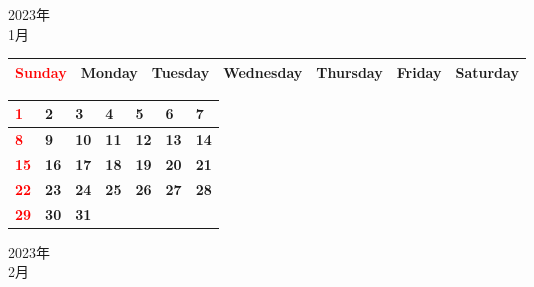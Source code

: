 \documentclass[a4paper,landscape]{jsarticle}
\newcommand{\dig}{\hspace{29mm}}
\newcommand{\tdig}{\hspace{27mm}}
\newcommand{\LBF}{\LARGE\textbf}
\begin{document}
\pagestyle{empty}

\begin{center}
	\LARGE 2023年\\
	\LARGE 1月
\end{center}

\begingroup
\renewcommand{\arraystretch}{1.4}
\begin{tabular}{|>{\centering\arraybackslash}p{32mm}|>{\centering\arraybackslash}p{32mm}|>{\centering\arraybackslash}p{32mm}|>{\centering\arraybackslash}p{32mm}|>{\centering\arraybackslash}p{32mm}|>{\centering\arraybackslash}p{32mm}|>{\centering\arraybackslash}p{32mm}|}
\hline
\textcolor{red}{\large Sunday}&\large Monday&\large Tuesday&\large Wednesday&\large Thursday&\large Friday&\large Saturday\\
\hline
\end{tabular}
\endgroup

\begingroup
\renewcommand{\arraystretch}{4}
\begin{tabular}{|p{32mm}|p{32mm}|p{32mm}|p{32mm}|p{32mm}|p{32mm}|p{32mm}|}
\hline
\raisebox{30pt} {\dig\textcolor{red}{\LBF{1}}}&\raisebox{30pt} {\dig\LBF{2}}&\raisebox{30pt} {\dig\LBF{3}}&\raisebox{30pt} {\dig\LBF{4}}&\raisebox{30pt} {\dig\LBF{5}}&\raisebox{30pt} {\dig\LBF{6}}&\raisebox{30pt} {\dig\LBF{7}}\\
\hline
\raisebox{30pt} {\dig\textcolor{red}{\LBF{8}}}&\raisebox{30pt} {\dig\LBF{9}}&\raisebox{30pt} {\tdig\LBF{10}}&\raisebox{30pt} {\tdig\LBF{11}}&\raisebox{30pt} {\tdig\LBF{12}}&\raisebox{30pt} {\tdig\LBF{13}}&\raisebox{30pt} {\tdig\LBF{14}}\\
\hline
\raisebox{30pt} {\tdig\textcolor{red}{\LBF{15}}}&\raisebox{30pt} {\tdig\LBF{16}}&\raisebox{30pt} {\tdig\LBF{17}}&\raisebox{30pt} {\tdig\LBF{18}}&\raisebox{30pt} {\tdig\LBF{19}}&\raisebox{30pt} {\tdig\LBF{20}}&\raisebox{30pt} {\tdig\LBF{21}}\\
\hline
\raisebox{30pt} {\tdig\textcolor{red}{\LBF{22}}}&\raisebox{30pt} {\tdig\LBF{23}}&\raisebox{30pt} {\tdig\LBF{24}}&\raisebox{30pt} {\tdig\LBF{25}}&\raisebox{30pt} {\tdig\LBF{26}}&\raisebox{30pt} {\tdig\LBF{27}}&\raisebox{30pt} {\tdig\LBF{28}}\\
\hline
\raisebox{30pt} {\tdig\textcolor{red}{\LBF{29}}}&\raisebox{30pt} {\tdig\LBF{30}}&\raisebox{30pt} {\tdig\LBF{31}}&&&&\\
\hline
\end{tabular}
\endgroup

\newpage

\begin{center}
	\LARGE 2023年\\
	\LARGE 2月
\end{center}
\end{document}
